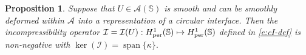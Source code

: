 \documentclass[11pt]{amsart}
\theoremstyle{plain}
\def\cA{{\mathcal A}}
\def\cI{{\mathcal I}}
\def\mbbS{\mathbb{S}}
\def\mrV{\textrm V}
\def\eps{\varepsilon}
\DeclareMathOperator{\Span}{span}
\numberwithin{equation}{section}
\theoremstyle{plain}
\newtheorem{remark}{Remark}
\newtheorem{prop}[thm]{Proposition}
\begin{document}

\begin{prop}
\label{p:cI-pos}
Suppose that $U\in\cA(\mbbS)$ is smooth and can be smoothly deformed within $\cA$ into a representation of a circular interface. Then the incompressibility operator $\cI=\cI(U):H^1_{\rm per}(\mbbS)\mapsto H^1_{\rm per}(\mbbS)$ defined in \eqref{e:cI-def} is non-negative with $\ker(\cI)=\Span\{\kappa\}.$
\end{prop}
\end{document}
